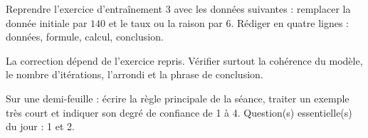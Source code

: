 
    \begin{homework}Reprendre l'exercice d'entraînement 3 avec les données suivantes : remplacer la donnée initiale par $140$ et le taux ou la raison par $6$. Rédiger en quatre lignes : données, formule, calcul, conclusion.\end{homework}
    \begin{solution}La correction dépend de l'exercice repris. Vérifier surtout la cohérence du modèle, le nombre d'itérations, l'arrondi et la phrase de conclusion.\end{solution}

    \begin{exitticket}[3 minutes]Sur une demi-feuille : écrire la règle principale de la séance, traiter un exemple très court et indiquer son degré de confiance de 1 à 4. Question(s) essentielle(s) du jour : 1 et 2.\end{exitticket}

